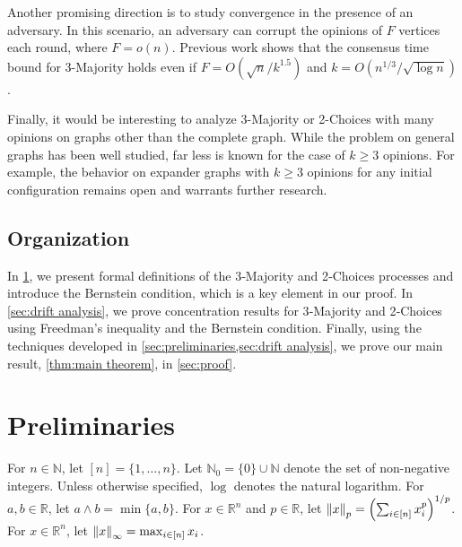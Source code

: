 \documentclass[letterpaper,11pt]{article}
\newcommand{\Nat}{\mathbb{N}}
\newcommand{\Real}{\mathbb{R}}
\begin{document}
Another promising direction is to study convergence in the presence of an adversary.
In this scenario, an adversary can corrupt the opinions of $F$ vertices each round, where $F = o(n)$.
Previous work \cite{nearly_tight_analysis} shows that the consensus time bound for 3-Majority holds even if $F =O( \sqrt{n}/k^{1.5})$ and $k =O( n^{1/3}/\sqrt{\log n})$.

Finally, it would be interesting to analyze 3-Majority or 2-Choices with many opinions on graphs other than the complete graph.
While the problem on general graphs has been well studied, far less is known for the case of $k \geq 3$ opinions.
For example, the behavior on expander graphs with $k \geq 3$ opinions for any initial configuration remains open and warrants further research.




\subsection{Organization}
In \cref{sec:preliminaries}, we present formal definitions of the 3‑Majority and 2‑Choices processes and introduce the Bernstein condition, which is a key element in our proof. 
In \cref{sec:drift analysis}, we prove concentration results for 3‑Majority and 2‑Choices using Freedman's inequality and the Bernstein condition. 
Finally, using the techniques developed in \cref{sec:preliminaries,sec:drift analysis}, we prove our main result, \cref{thm:main theorem}, in \cref{sec:proof}.
\section{Preliminaries} \label{sec:preliminaries}
For $n\in\Nat$, let $[n]=\{1,\dots,n\}$.
Let $\Nat_0 = \{0\}\cup\Nat$ denote the set of non-negative integers.
Unless otherwise specified, $\log$ denotes the natural logarithm.
For $a,b\in\Real$, let $a \land b = \min\{a,b\}$.
For $x\in \mathbb{R}^n$ and $p\in \mathbb{R}$, let $\norm{x}_p=\qty(\sum_{i\in [n]}x_i^p)^{1/p}$.
For $x\in \mathbb{R}^n$, let $\norm{x}_\infty=\max_{i\in [n]}x_i$.
\end{document}
